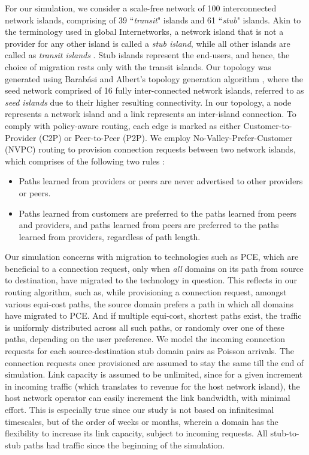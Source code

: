 \documentclass[smallextended]{svjour3}
\begin{document}
For our simulation, we consider a scale-free network of 100 interconnected
network islands, comprising of 39 ``\emph{transit}" islands and 61
``\emph{stub}" islands.  Akin to the terminology used in global Internetworks, a
network island that is not a provider for any other island is called a
\emph{stub island}, while all other islands are called as \emph{transit islands}
\cite{gao}. Stub islands represent the end-users, and hence, the choice of
migration rests only with the transit islands. Our topology was generated using
Barab\'asi and Albert's topology generation algorithm \cite{Albert00}, where the
seed network comprised of 16 fully inter-connected network islands, referred to
as \emph{seed islands} due to their higher resulting connectivity.
In our topology, a node represents a network island and a link represents an
inter-island connection. To comply with policy-aware routing, each edge is
marked as either Customer-to-Provider (C2P) or Peer-to-Peer (P2P). We employ
No-Valley-Prefer-Customer (NVPC) routing to provision connection requests
between two network islands, which comprises of the following two
rules \cite{He12}:
\begin{itemize}
  \item Paths learned from providers or peers are never advertised to other providers or peers.
  \item Paths learned from customers are preferred to the paths learned from peers and providers, and paths learned from peers are preferred to the paths learned from providers, regardless of path length.
\end{itemize}

\par Our simulation concerns with migration
to technologies such as PCE, which are beneficial to a connection request, only
when \emph{all} domains on its path from source to destination, have migrated to
the technology in question. This reflects in our routing algorithm, such as,
while provisioning a connection request, amongst various equi-cost paths, the
source domain prefers a path in which all domains have migrated to PCE.
And if multiple equi-cost, shortest paths exist,
the traffic is uniformly distributed across all such paths, or randomly over
one of these paths, depending on the user preference. We model the incoming connection requests
for each source-destination stub domain pairs as Poisson arrivals. The connection requests once provisioned are assumed to stay the same till the end of simulation. Link capacity is
assumed to be unlimited, since for a given increment in incoming traffic (which
translates to revenue for the host network island), the host network operator
can easily increment the link bandwidth, with minimal effort. This is especially
true since our study is not based on infinitesimal timescales, but of the order
of weeks or months, wherein a domain has the flexibility to increase its link
capacity, subject to incoming requests. All stub-to-stub paths had traffic since
the beginning of the simulation.
\end{document}

